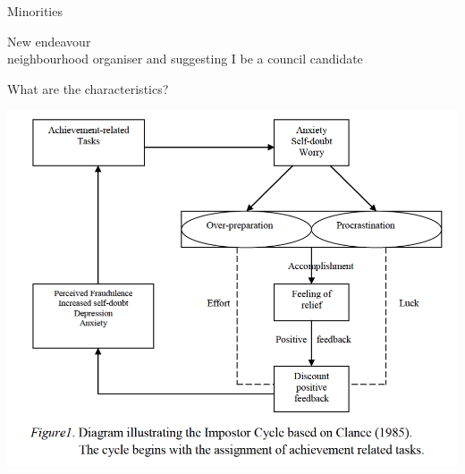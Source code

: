 \documentclass[aspectratio=169]{beamer}
\begin{document}
\begin{frame}
  \begin{center}
    \Huge Minorities
    \\ \small \cite{apa13}
  \end{center}
\end{frame}

\begin{frame}
  \begin{center}
    \Huge New endeavour
    \\ \small \cite{apa13}
    neighbourhood organiser and suggesting I be a council candidate
  \end{center}
\end{frame}

\begin{frame}
  \begin{center}
    \Huge What are the characteristics?
  \end{center}
\end{frame}

\begin{frame}
  \begin{center}
    \includegraphics[scale=.5]{./assets/clance-impostor-cycle.png}
    \\ \small \cite{sakulku11}
  \end{center}
\end{frame}
\end{document}
